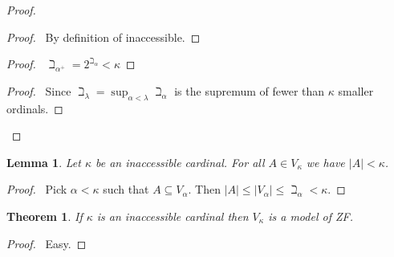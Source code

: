 \documentclass{report}
\let\qed\relax
\newtheorem{lemma}[axiom]{Lemma}
\newtheorem{theorem}[axiom]{Theorem}
\theoremstyle{definition}
\begin{document}
    \begin{proof}
        \pf
        \begin{proof}
            \pf\ By definition of inaccessible.
        \end{proof}
        \begin{proof}
            \pf\ $\beth_{\alpha^+} = 2^{\beth_\alpha} < \kappa$
        \end{proof}
        \begin{proof}
            \pf\ Since $\beth_\lambda = \sup_{\alpha < \lambda} \beth_\alpha$ is the supremum of fewer than $\kappa$
            smaller ordinals.
        \end{proof}
        \qed
    \end{proof}

    \begin{lemma}
        Let $\kappa$ be an inaccessible cardinal. For all $A \in V_\kappa$ we have $|A| < \kappa$.
    \end{lemma}

    \begin{proof}
        \pf\ Pick $\alpha < \kappa$ such that $A \subseteq V_\alpha$. Then $|A| \leq |V_\alpha| \leq \beth_\alpha < \kappa$. \qed
    \end{proof}

    \begin{theorem}
        If $\kappa$ is an inaccessible cardinal then $V_\kappa$ is a model of ZF.
    \end{theorem}

    \begin{proof}
        \pf\ Easy. \qed
    \end{proof}
\end{document}
